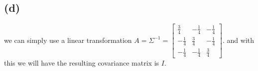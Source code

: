 \subsection*{(d)}
we can simply use a linear transformation $A=\Sigma^{-1}=
\begin{bmatrix}\frac{3}{4}&-\frac{1}{4}&-\frac{1}{4}\\ -\frac{1}{4}&\frac{3}{4}&-\frac{1}{4}\\ -\frac{1}{4}&-\frac{1}{4}&\frac{3}{4}\end{bmatrix}$.
and with this we will have the resulting covariance matrix is 
$I$.





